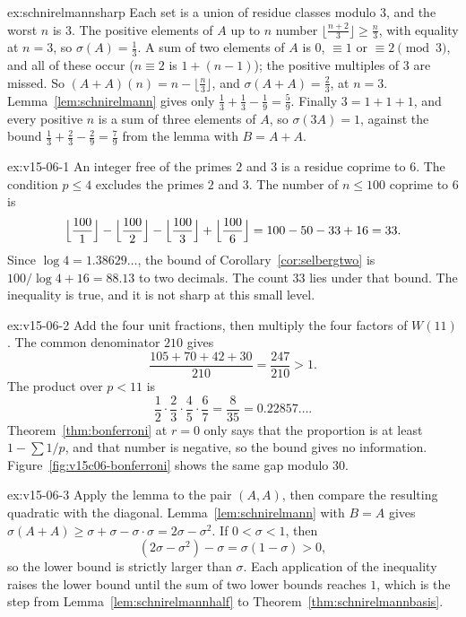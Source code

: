 \begin{solution}{ex:schnirelmannsharp}
\idea Each set is a union of residue classes modulo $3$, and the worst $n$ is $3$.
\writeup The positive elements of $A$ up to $n$ number $\lfloor\frac{n+2}3\rfloor\ge\frac n3$, with equality at $n=3$, so $\sigma(A)=\frac13$. A sum of two elements of $A$ is $0$, $\equiv1$ or $\equiv2\pmod3$, and all of these occur ($n\equiv2$ is $1+(n-1)$); the positive multiples of $3$ are missed. So $(A+A)(n)=n-\lfloor\frac n3\rfloor$, and $\sigma(A+A)=\frac23$, at $n=3$. Lemma~\ref{lem:schnirelmann} gives only $\frac13+\frac13-\frac19=\frac59$. Finally $3=1+1+1$, and every positive $n$ is a sum of three elements of $A$, so $\sigma(3A)=1$, against the bound $\frac13+\frac23-\frac29=\frac79$ from the lemma with $B=A+A$.
\end{solution}

\begin{solution}{ex:v15-06-1}
\idea An integer free of the primes \(2\) and \(3\) is a residue coprime to \(6\).
\writeup The condition \(p\le4\) excludes the primes \(2\) and \(3\). The number of \(n\le100\) coprime to \(6\) is
\[
\Bigl\lfloor\frac{100}1\Bigr\rfloor-\Bigl\lfloor\frac{100}2\Bigr\rfloor-\Bigl\lfloor\frac{100}3\Bigr\rfloor+\Bigl\lfloor\frac{100}6\Bigr\rfloor=100-50-33+16=33.
\]
Since \(\log4=1.38629\ldots\), the bound of Corollary~\ref{cor:selbergtwo} is \(100/\log4+16=88.13\) to two decimals. The count \(33\) lies under that bound. The inequality is true, and it is not sharp at this small level.
\end{solution}

\begin{solution}{ex:v15-06-2}
\idea Add the four unit fractions, then multiply the four factors of \(W(11)\).
\writeup The common denominator \(210\) gives
\[
\frac{105+70+42+30}{210}=\frac{247}{210}>1.
\]
The product over \(p<11\) is
\[
\frac12\cdot\frac23\cdot\frac45\cdot\frac67=\frac{8}{35}=0.22857\ldots.
\]
Theorem~\ref{thm:bonferroni} at \(r=0\) only says that the proportion is at least \(1-\sum 1/p\), and that number is negative, so the bound gives no information. Figure~\ref{fig:v15c06-bonferroni} shows the same gap modulo \(30\).
\end{solution}

\begin{solution}{ex:v15-06-3}
\idea Apply the lemma to the pair \((A,A)\), then compare the resulting quadratic with the diagonal.
\writeup Lemma~\ref{lem:schnirelmann} with \(B=A\) gives \(\sigma(A+A)\ge\sigma+\sigma-\sigma\cdot\sigma=2\sigma-\sigma^2\). If \(0<\sigma<1\), then
\[
(2\sigma-\sigma^2)-\sigma=\sigma(1-\sigma)>0,
\]
so the lower bound is strictly larger than \(\sigma\). Each application of the inequality raises the lower bound until the sum of two lower bounds reaches \(1\), which is the step from Lemma~\ref{lem:schnirelmannhalf} to Theorem~\ref{thm:schnirelmannbasis}.
\end{solution}

